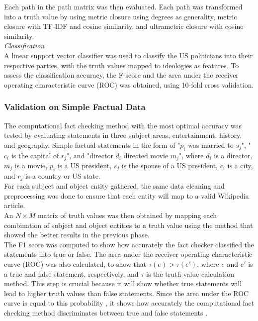 \documentclass[10pt,11pt,12pt,oneside]{book}
\begin{document}
Each path in the path matrix was then evaluated. Each path was transformed into a truth value by using metric closure using degrees as generality, metric closure with TF-IDF and cosine similarity, and ultrametric closure with cosine similarity.\\

\textit{Classification}\\

A linear support vector classifier was used to classify the US politicians into their respective parties, with the truth values mapped to ideologies as features. To assess the classification accuracy, the F-score and the area under the receiver operating characteristic curve (ROC) was obtained, using 10-fold cross validation.

\subsubsection{Validation on Simple Factual Data}
The computational fact checking method with the most optimal accuracy was tested by evaluating statements in three subject areas, entertainment, history, and geography. Simple factual statements in the form of "$ p_{i} $ was married to $ s_{j} $", "$ c_{i} $ is the capital of $ r_{j} $", and "director $ d_{i} $ directed movie $ m_{j} $", where $ d_{i} $ is a director, $ m_{j} $ is a movie, $ p_{i} $ is a US president, $ s_{j} $ is the spouse of a US president, $ c_{i} $ is a city, and $ r_{j} $ is a country or US state. \\

For each subject and object entity gathered, the same data cleaning and preprocessing was done to ensure that each entity will map to a valid Wikipedia article.\\

An $ N \times M $ matrix of truth values was then obtained by mapping each combination of subject and object entities to a truth value using the method that showed the better results in the previous phase.\\

The F1 score was computed to show how accurately the fact checker classified the statements into true or false. The area under the receiver operating characteristic curve (ROC) was also calculated, to show that $ \tau (e) > \tau (e \prime)$, where $ e $ and $ e \prime $ is a true and false statement, respectively, and $ \tau $ is the truth value calculation method. This step is crucial because it will show whether true statements will lead to higher truth values than false statements. Since the area under the ROC curve is equal to this probability \cite{Fawcett2006}, it shows how accurately the computational fact checking method discriminates between true and false statements .
\end{document}
